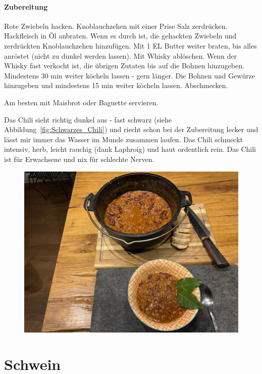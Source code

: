 \paragraph{Zubereitung}

Rote Zwiebeln hacken. Knoblauchzehen mit einer Prise Salz zerdrücken. 
Hackfleisch in Öl anbraten. Wenn es durch ist, die gehackten Zwiebeln und 
zerdrückten 
Knoblauchzehen hinzufügen. Mit 1 EL Butter weiter braten, bis alles anröstet 
(nicht zu dunkel werden lassen). Mit Whisky ablöschen. Wenn der Whisky fast 
verkocht 
ist, die übrigen Zutaten bis auf die Bohnen hinzugeben. Mindestens 30 min 
weiter köcheln lassen - gern länger. Die Bohnen und Gewürze hinzugeben und 
mindestens
15 min weiter köcheln lassen. Abschmecken.

Am besten mit Maisbrot oder Baguette servieren.

Das Chili sieht richtig dunkel aus - fast schwarz (siehe 
Abbildung~\vref{fig:Schwarzes_Chili}) und riecht schon bei der Zubereitung 
lecker und lässt mir immer das Wasser im Munde zusammen laufen. Das Chili 
schmeckt intensiv, herb, leicht rauchig (dank Laphroig) und haut ordentlich 
rein. Das Chili ist für Erwachsene und nix für schlechte Nerven.
\newpage

\begin{figure}[htbp]
	\centering
	\begin{minipage}{1\textwidth}
		\centering
		\includegraphics[width=.9\linewidth]{pics/Schwarzes Chili}
		\label{fig:Schwarzes_Chili}
	\end{minipage}
\end{figure}
\newpage

\section{Schwein}

